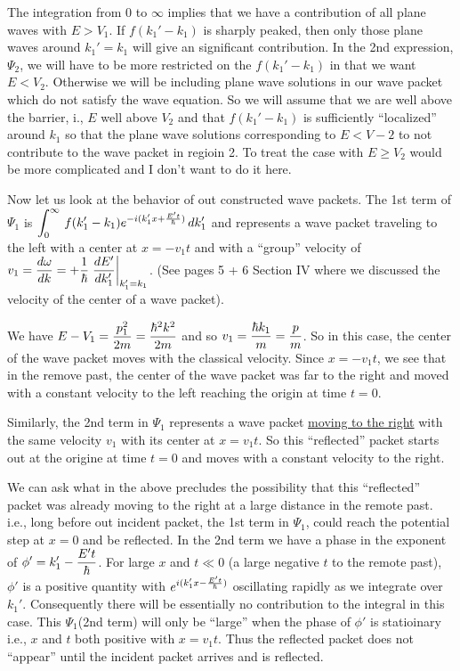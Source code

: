 The integration from $0$ to $\infty$ implies that we have a contribution of all plane waves with $E>V_1$. If $f(k_1'-k_1)$ is sharply peaked, then only those plane waves around $k_1'=k_1$ will give an significant contribution. 
In the 2nd expression, $\Psi_2$, we will have to be more restricted on the $f(k_1'-k_1)$ in that we want $E<V_2$. Otherwise we will be including plane wave solutions in our wave packet which do not satisfy the wave equation. So 
we will assume that we are well above the barrier, i., $E$ well above $V_2$ and that $f(k_1'-k_1)$ is sufficiently ``localized'' around $k_1$ so that the plane wave solutions corresponding to $E<V-2$ to not contribute to the wave packet in 
regioin 2. To treat the case with $E\ge V_2$ would be more complicated and I don't want to do it here.

Now let us look at the behavior of out constructed wave packets. The 1st term of $\Psi_1$ is $\displaystyle \int_0^\infty\, f(k_1' - k_1) e^{-i(k_1'x + {E't\over\hbar})}\, dk_1'$ and represents a wave packet traveling to the left with a center at 
$x=-v_1t$ and with a ``group'' velocity of $\displaystyle v_1 = {d\omega\over dk} = +{1\over\hbar}\left.{dE'\over dk_1'}\right|_{k_1' = k_1}$. (See pages 5 + 6 Section IV where we discussed the velocity of the center of a wave packet).

We have $\displaystyle E-V_1 = {p_1^2\over2m} = {\hbar^2k^2\over2m}$ and so $\displaystyle v_1 = {\hbar k_1\over m} = {p\over m}$. So in this case, the center of the wave packet moves with the classical velocity. Since $x=-v_1t$, we see that in the remove past, the center of the wave packet was far to the right and moved with a constant velocity to the left reaching the origin at time $t=0$.

Similarly, the 2nd term in $\Psi_1$ represents a wave packet \underline{moving to the right} with the same velocity $v_1$ with its center at $x=v_1t$. So this ``reflected'' packet starts out at the origine at time $t=0$ and moves with a constant 
velocity to the right.

We can ask what in the above precludes the possibility that this ``reflected'' packet was already moving to the right at a large distance in the remote past. i.e., long before out incident packet, the 1st term in $\Psi_1$, could reach 
the potential step at $x=0$ and be reflected. In the 2nd term we have a phase in the exponent of $\displaystyle \phi' = k_1' - {E't\over\hbar}$. For large $x$ and $t\ll0$ (a large negative $t$ to the remote past), $\phi'$ is a positive quantity with 
$\displaystyle e^{i(k_1'x - {E't\over\hbar})}$ oscillating rapidly as we integrate over $k_1'$. Consequently there will be essentially no contribution to the integral in this case. This $\Psi_1$(2nd term) will only be ``large'' when the phase of 
$\phi'$ is statioinary i.e., $x$ and $t$ both positive with $x = v_1t$. Thus the reflected packet does not ``appear'' until the incident packet arrives and is reflected. 

